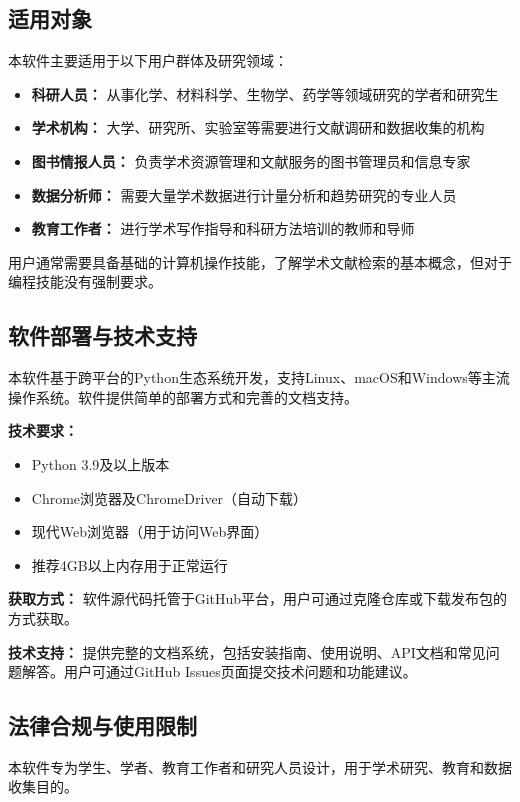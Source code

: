 \subsection{适用对象}
\label{ssec:intro_target_audience}
本软件主要适用于以下用户群体及研究领域：

\begin{itemize}
    \item \textbf{科研人员：} 从事化学、材料科学、生物学、药学等领域研究的学者和研究生
    \item \textbf{学术机构：} 大学、研究所、实验室等需要进行文献调研和数据收集的机构
    \item \textbf{图书情报人员：} 负责学术资源管理和文献服务的图书管理员和信息专家
    \item \textbf{数据分析师：} 需要大量学术数据进行计量分析和趋势研究的专业人员
    \item \textbf{教育工作者：} 进行学术写作指导和科研方法培训的教师和导师
\end{itemize}

用户通常需要具备基础的计算机操作技能，了解学术文献检索的基本概念，但对于编程技能没有强制要求。

\subsection{软件部署与技术支持}
\label{ssec:intro_deployment_support}
本软件基于跨平台的Python生态系统开发，支持Linux、macOS和Windows等主流操作系统。软件提供简单的部署方式和完善的文档支持。

\textbf{技术要求：}
\begin{itemize}
    \item Python 3.9及以上版本
    \item Chrome浏览器及ChromeDriver（自动下载）
    \item 现代Web浏览器（用于访问Web界面）
    \item 推荐4GB以上内存用于正常运行
\end{itemize}

\textbf{获取方式：}
软件源代码托管于GitHub平台，用户可通过克隆仓库或下载发布包的方式获取。

\textbf{技术支持：}
提供完整的文档系统，包括安装指南、使用说明、API文档和常见问题解答。用户可通过GitHub Issues页面提交技术问题和功能建议。

\subsection{法律合规与使用限制}
\label{ssec:intro_legal_compliance}
本软件专为学生、学者、教育工作者和研究人员设计，用于学术研究、教育和数据收集目的。

